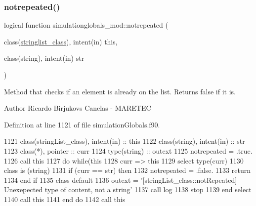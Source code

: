 \subsubsection{\texorpdfstring{notrepeated()}{notrepeated()}}
{\footnotesize\ttfamily logical function simulationglobals\+\_\+mod\+::notrepeated (\begin{DoxyParamCaption}\item[{class(\mbox{\hyperlink{structsimulationglobals__mod_1_1stringlist__class}{stringlist\+\_\+class}}), intent(in)}]{this,  }\item[{class(string), intent(in)}]{str }\end{DoxyParamCaption})\hspace{0.3cm}{\ttfamily [private]}}



Method that checks if an element is already on the list. Returns false if it is. 

\begin{DoxyAuthor}{Author}
Ricardo Birjukovs Canelas -\/ M\+A\+R\+E\+T\+EC 
\end{DoxyAuthor}


Definition at line 1121 of file simulation\+Globals.\+f90.


\begin{DoxyCode}
1121     \textcolor{keywordtype}{class}(stringList\_class), \textcolor{keywordtype}{intent(in)} :: this
1122     \textcolor{keywordtype}{class}(string), \textcolor{keywordtype}{intent(in)} :: str
1123     \textcolor{keywordtype}{class}(*), \textcolor{keywordtype}{pointer} :: curr
1124     \textcolor{keywordtype}{type}(string) :: outext
1125     notrepeated = .true.
1126     \textcolor{keyword}{call }this%
1127     \textcolor{keywordflow}{do} \textcolor{keywordflow}{while}(this%
1128         curr => this%
1129         \textcolor{keywordflow}{select type}(curr)
1130 \textcolor{keywordflow}{        class is} (string)
1131             \textcolor{keywordflow}{if} (curr == str) \textcolor{keywordflow}{then}
1132                 notrepeated = .false.
1133                 \textcolor{keywordflow}{return}
1134 \textcolor{keywordflow}{            end if}
1135 \textcolor{keywordflow}{            class default}
1136             outext = \textcolor{stringliteral}{'[stringList\_class::notRepeated] Unexepected type of content, not a string'}
1137             \textcolor{keyword}{call }log%
1138             stop
1139 \textcolor{keywordflow}{        end select}
1140         \textcolor{keyword}{call }this%
1141 \textcolor{keywordflow}{    end do}
1142     \textcolor{keyword}{call }this%
\end{DoxyCode}
\mbox{\label{namespacesimulationglobals__mod_a7adb33aaa9ea0a94c38789c07ff3e787}} 
